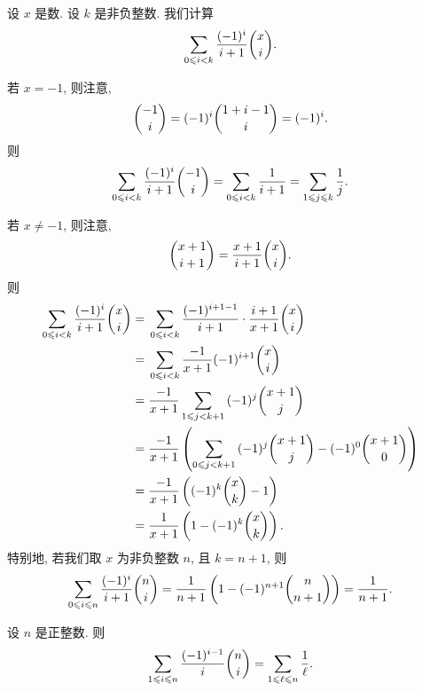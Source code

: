 \documentclass[../libro.tex]{subfiles}
\begin{document}
\begin{example}
    设 \(x\) 是数.
    设 \(k\) 是非负整数.
    我们计算
    \begin{align*}
        \sum_{0 \leq i < k} {\frac{(-1)^i}{i+1} \dbinom{x}{i}}.
    \end{align*}

    若 \(x = -1\), 则注意,
    \begin{align*}
        \dbinom{-1}{i} = (-1)^i \dbinom{1+i-1}{i} = (-1)^i.
    \end{align*}
    则
    \begin{align*}
        \sum_{0 \leq i < k} {\frac{(-1)^i}{i+1} \dbinom{-1}{i}}
        = \sum_{0 \leq i < k} {\frac{1}{i+1}}
        = \sum_{1 \leq j \leq k} {\frac{1}{j}}.
    \end{align*}

    若 \(x \neq -1\), 则注意,
    \begin{align*}
        \dbinom{x+1}{i+1} = \frac{x+1}{i+1} \dbinom{x}{i}.
    \end{align*}
    则
    \begin{align*}
        \sum_{0 \leq i < k} {\frac{(-1)^i}{i+1} \dbinom{x}{i}}
        = {} &
        \sum_{0 \leq i < k} {\frac{(-1)^{i+1-1}}{i+1}
        \cdot \frac{i+1}{x+1} \dbinom{x}{i}}
        \\
        = {} &
        \sum_{0 \leq i < k} {\frac{-1}{x+1} (-1)^{i+1} \dbinom{x}{i}}
        \\
        = {} &
        \frac{-1}{x+1} \sum_{1 \leq j < k+1} {(-1)^j \dbinom{x+1}{j}}
        \\
        = {} &
        \frac{-1}{x+1}
        \left(\sum_{0 \leq j < k+1} {(-1)^j \dbinom{x+1}{j}}
        - (-1)^0 \dbinom{x+1}{0}\right)
        \\
        = {} &
        \frac{-1}{x+1} \left((-1)^k \dbinom{x}{k} - 1\right)
        \\
        = {} &
        \frac{1}{x+1} \left(1 - (-1)^k \dbinom{x}{k}\right).
    \end{align*}
    特别地, 若我们取 \(x\) 为非负整数 \(n\),
    且 \(k = n + 1\), 则
    \begin{equation*}
        \sum_{0 \leq i \leq n} {\frac{(-1)^i}{i+1} \dbinom{n}{i}}
        = \frac{1}{n+1} \left(1 - (-1)^{n+1} \dbinom{n}{n+1}\right)
        = \frac{1}{n+1}.
        \qefhere
    \end{equation*}
\end{example}

\begin{theorem}
    设 \(n\) 是正整数.
    则
    \begin{align*}
        \sum_{1 \leq i \leq n} {\frac{(-1)^{i-1}}{i} \dbinom{n}{i}}
        = \sum_{1 \leq \ell \leq n} {\frac{1}{\ell}}.
    \end{align*}
\end{theorem}
\end{document}
